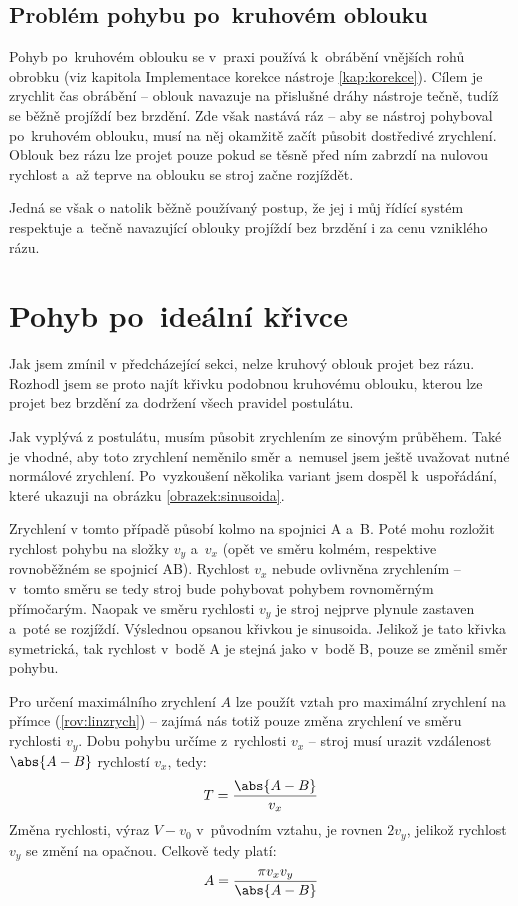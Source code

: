 		\subsection{Problém pohybu po~kruhovém oblouku}
		Pohyb po~kruhovém oblouku se v~praxi používá k~obrábění vnějších rohů obrobku (viz kapitola Implementace korekce nástroje \ref{kap:korekce}). Cílem je zrychlit čas obrábění -- oblouk navazuje na přislušné dráhy nástroje tečně, tudíž se běžně projíždí bez brzdění. Zde však nastává ráz -- aby se nástroj pohyboval po~kruhovém oblouku, musí na něj okamžitě začít působit dostředivé zrychlení. Oblouk bez rázu lze projet pouze pokud se těsně před ním zabrzdí na nulovou rychlost a~až teprve na oblouku se stroj začne rozjíždět.
		
		Jedná se však o natolik běžně používaný postup, že jej i můj řídící systém respektuje a~tečně navazující oblouky projíždí bez brzdění i za cenu vzniklého rázu.
	
	\section{Pohyb po~ideální křivce}\label{kap:krivka}
		Jak jsem zmínil v předcházející sekci, nelze kruhový oblouk projet bez rázu. Rozhodl jsem se proto najít křivku podobnou kruhovému oblouku, kterou lze projet bez brzdění za dodržení všech pravidel postulátu. 
		
		Jak vyplývá z postulátu, musím působit zrychlením ze sinovým průběhem. Také je vhodné, aby toto zrychlení neměnilo směr a~nemusel jsem ještě uvažovat nutné normálové zrychlení. Po~vyzkoušení několika variant jsem dospěl k~uspořádání, které ukazuji na obrázku \ref{obrazek:sinusoida}.
		
		Zrychlení v tomto případě působí kolmo na spojnici A a~B. Poté mohu rozložit rychlost pohybu na složky $v_y$ a~$v_x$ (opět ve směru kolmém, respektive rovnoběžném se spojnicí AB). Rychlost $v_x$ nebude ovlivněna zrychlením -- v~tomto směru se tedy stroj bude pohybovat pohybem rovnoměrným přímočarým. Naopak ve směru rychlosti $v_y$ je stroj nejprve plynule zastaven a~poté se rozjíždí. Výslednou opsanou křivkou je sinusoida. Jelikož je tato křivka symetrická, tak rychlost v~bodě A je stejná jako v~bodě B, pouze se změnil směr pohybu.
		
		Pro určení maximálního zrychlení $A$ lze použít vztah pro maximální zrychlení na přímce (\ref{rov:linzrych}) -- zajímá nás totiž pouze změna zrychlení ve směru rychlosti $v_y$. Dobu pohybu určíme z~rychlosti $v_x$ -- stroj musí urazit vzdálenost $\abs{A-B}$ rychlostí $v_x$, tedy:
		\begin{equation}
			T = \frac{\abs{A-B}}{v_x}
		\end{equation}
		Změna rychlosti, výraz $V-v_0$ v~původním vztahu, je rovnen $2v_y$, jelikož rychlost $v_y$ se změní na opačnou. Celkově tedy platí:
		\begin{equation}
			A = \frac{\pi v_xv_y}{\abs{A-B}}
		\end{equation}
		
